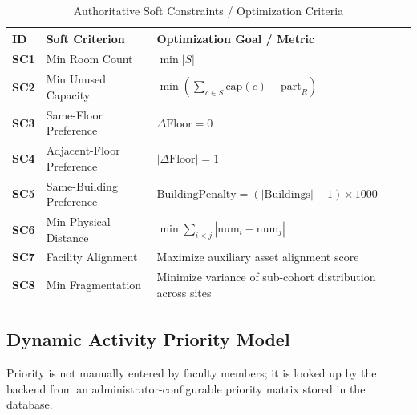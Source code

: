 \documentclass[conference]{IEEEtran}
\begin{document}
\begin{table}[t]
\caption{Authoritative Soft Constraints / Optimization Criteria}
\label{tab:soft_constraints}
\centering
\small
\begin{tabular}{p{1.2cm} p{4.2cm} p{11.3cm}}
\toprule
\textbf{ID} & \textbf{Soft Criterion} & \textbf{Optimization Goal / Metric} \\
\midrule
\textbf{SC1} & Min Room Count & $\min |S|$ \\
\textbf{SC2} & Min Unused Capacity & $\min \left( \sum_{c \in S} \text{cap}(c) - \text{part}_R \right)$ \\
\textbf{SC3} & Same-Floor Preference & $\Delta \text{Floor} = 0$ \\
\textbf{SC4} & Adjacent-Floor Preference & $|\Delta \text{Floor}| = 1$ \\
\textbf{SC5} & Same-Building Preference & $\text{BuildingPenalty} = (|\text{Buildings}| - 1) \times 1000$ \\
\textbf{SC6} & Min Physical Distance & $\min \sum_{i < j} |\text{num}_i - \text{num}_j|$ \\
\textbf{SC7} & Facility Alignment & Maximize auxiliary asset alignment score \\
\textbf{SC8} & Min Fragmentation & Minimize variance of sub-cohort distribution across sites \\
\bottomrule
\end{tabular}
\end{table}

\subsection{Dynamic Activity Priority Model}
Priority is not manually entered by faculty members; it is looked up by the backend from an administrator-configurable priority matrix stored in the database.
\end{document}
